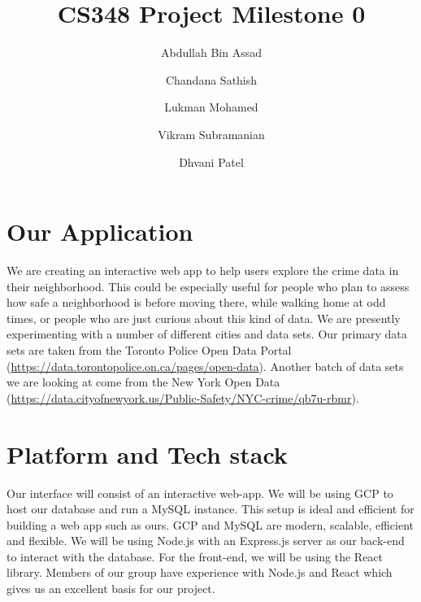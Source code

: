 \documentclass[12pt, a4paper]{article}
\title{CS348 Project Milestone 0}
\author{Abdullah Bin Assad\and Chandana Sathish \and Lukman Mohamed \and Vikram Subramanian \and Dhvani Patel}
\begin{document}
\maketitle

\section*{Our Application}
We are creating an interactive web app to help users explore the crime data in their neighborhood. This could be especially useful for people who plan to assess how safe a neighborhood is before moving there, while walking home at odd times, or people who are just curious about this kind of data. We are presently experimenting with a number of different cities and data sets. Our primary data sets are taken from the Toronto Police Open Data Portal (\url{https://data.torontopolice.on.ca/pages/open-data}). Another batch of data sets we are looking at come from the New York Open Data (\url{https://data.cityofnewyork.us/Public-Safety/NYC-crime/qb7u-rbmr}). 
\section*{Platform and Tech stack}
Our interface will consist of an interactive web-app. We will be using GCP to host our database and run a MySQL instance. This setup is ideal and efficient for building a web app such as ours. GCP and MySQL are modern, scalable, efficient and flexible. We will be using Node.js with an Express.js server as our back-end to interact with the database. For the front-end, we will be using the React library. Members of our group have experience with Node.js and React which gives us an excellent basis for our project.
\end{document}
